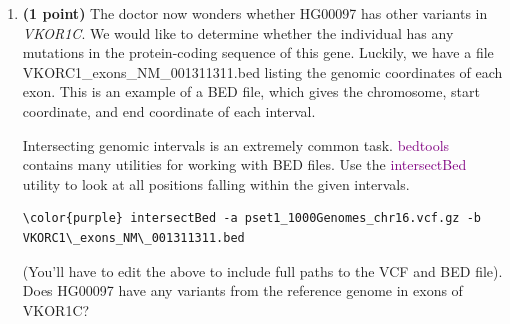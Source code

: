 \documentclass[12pt]{article}
\begin{document}
\begin{enumerate}
Now, use the tabix utility to pull out our SNP of interest:
\begin{Verbatim}[commandchars=\\\{\}]
\color{purple} tabix --print-header pset1\_1000Genomes\_chr16.vcf.gz 16:31104509-31104510
\end{Verbatim}

What dose should the doctor give to HG00097? What about HG00099 and HG00103?

\item \textbf{(1 point)} The doctor now wonders whether HG00097 has other variants in \emph{VKOR1C}. We would like to determine whether the individual has any mutations in the protein-coding sequence of this gene. Luckily, we have a file VKORC1\_exons\_NM\_001311311.bed listing the genomic coordinates of each exon. This is an example of a BED file, which gives the chromosome, start coordinate, and end coordinate of each interval.

Intersecting genomic intervals is an extremely common task. \textcolor{purple}{bedtools} contains many utilities for working with BED files. Use the \textcolor{purple}{intersectBed} utility to look at all positions falling within the given intervals.
\begin{Verbatim}[commandchars=\\\{\}]
\color{purple} intersectBed -a pset1_1000Genomes_chr16.vcf.gz -b VKORC1\_exons_NM\_001311311.bed
\end{Verbatim}
(You'll have to edit the above to include full paths to the VCF and BED file). Does HG00097 have any variants from the reference genome in exons of VKOR1C?

\end{enumerate}
\end{document}
